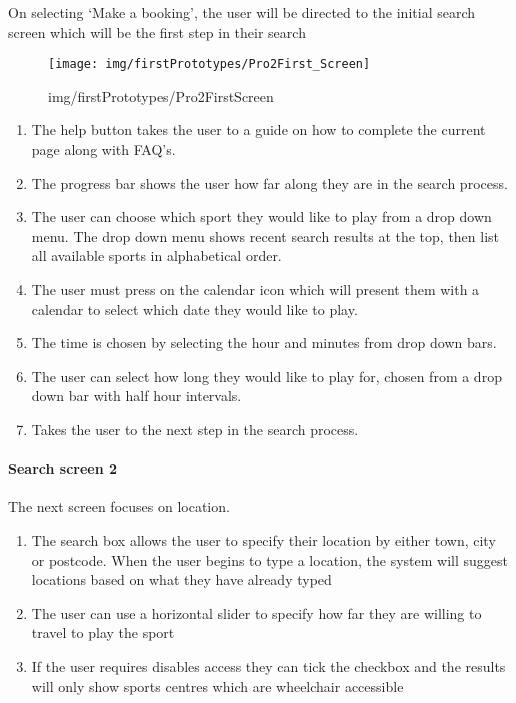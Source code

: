 On selecting `Make a booking', the user will be directed to the initial search
screen which will be the first step in their search

\begin{figure}[htpb]
    \centering
    \texttt{[image: img/firstPrototypes/Pro2First\_Screen]}
    \caption{img/firstPrototypes/Pro2FirstScreen
    }\label{fig:img/firstPrototypes/Pro2First_Screen}
\end{figure}

\begin{enumerate}
	\item The help button takes the user to a guide on how to complete the
		current page along with FAQ's.
	\item The progress bar shows the user how far along they are in the search
		process.
	\item The user can choose which sport they would like to play from a drop
		down menu. The drop down menu shows recent search results at the top,
		then list all available sports in alphabetical order.
	\item The user must press on the calendar icon which will present them with
		a calendar to select which date they would like to play.
	\item The time is chosen by selecting the hour and minutes from drop down
		bars.
	\item The user can select how long they would like to play for, chosen from
		a drop down bar with half hour intervals.
	\item Takes the user to the next step in the search process.
\end{enumerate}

\paragraph{Search screen 2}

The next screen focuses on location.

\begin{enumerate}
	\item The search box allows the user to specify their location by either
		town, city or postcode. When the user begins to type a location, the
		system will suggest locations based on what they have already typed
	\item The user can use a horizontal slider to specify how far they are
		willing to travel to play the sport
	\item If the user requires disables access they can tick the checkbox and
		the results will only show sports centres which are wheelchair
		accessible
\end{enumerate}

